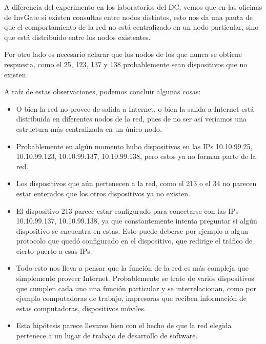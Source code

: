 A diferencia del experimento en los laboratorios del DC, vemos que en las oficinas de InvGate sí existen consultas entre nodos distintos, esto nos da una pauta de que el comportamiento de la red no está centralizado en un nodo particular, sino que está distribuido entre los nodos existentes.

Por otro lado es necesario aclarar que los nodos de los que nunca se obtiene respuesta, como el 25, 123, 137 y 138 probablemente sean dispositivos que no existen.

A raíz de estas observaciones, podemos concluir algunas cosas:
\begin{itemize}
  \item O bien la red no provee de salida a Internet, o bien la salida a Internet está distribuida en diferentes nodos de la red, pues de no ser así veríamos una estructura más centralizada en un único nodo.
  \item Probablemente en algún momento hubo dispositivos en las IPs 10.10.99.25, 10.10.99.123, 10.10.99.137, 10.10.99.138, pero estos ya no forman parte de la red.
  \item Los dispositivos que aún pertenecen a la red, como el 213 o el 34 no parecen estar enterados que los otros dispositivos ya no existen.
  \item El dispositivo 213 parece estar configurado para conectarse con las IPs 10.10.99.137, 10.10.99.138, ya que constantemente intenta preguntar si algún dispositivo se encuentra en estas. Esto puede deberse por ejemplo a algun protocolo que quedó configurado en el dispositivo, que redirige el tráfico de cierto puerto a esas IPs.
  \item Todo esto nos lleva a pensar que la función de la red es más compleja que simplemente proveer Internet. Probablemente se trate de varios dispositivos que cumplen cada uno una función particular y se interrelacionan, como por ejemplo computadoras de trabajo, impresoras que reciben información de estas computadoras, dispositivos móviles.
  \item Esta hipótesis parece llevarse bien con el hecho de que la red elegida pertenece a un lugar de trabajo de desarrollo de software.
\end{itemize}

